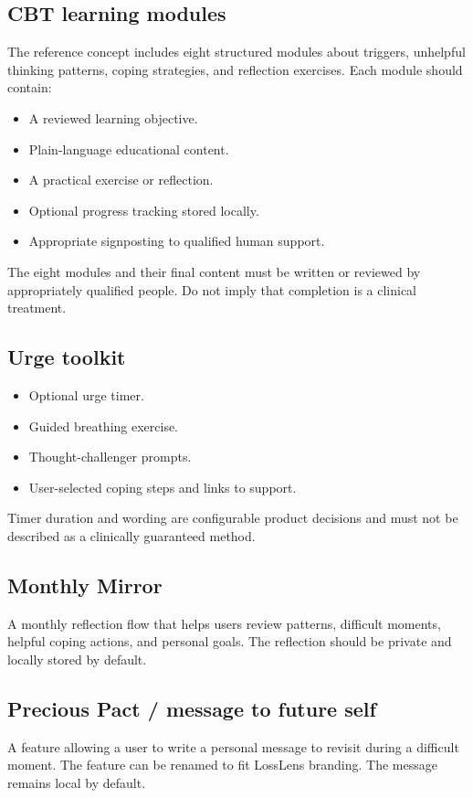 \documentclass[11pt,a4paper]{article}
\begin{document}
\subsection{CBT learning modules}
The reference concept includes eight structured modules about triggers, unhelpful thinking patterns, coping strategies, and reflection exercises. Each module should contain:
\begin{itemize}
  \item A reviewed learning objective.
  \item Plain-language educational content.
  \item A practical exercise or reflection.
  \item Optional progress tracking stored locally.
  \item Appropriate signposting to qualified human support.
\end{itemize}
The eight modules and their final content must be written or reviewed by appropriately qualified people. Do not imply that completion is a clinical treatment.

\subsection{Urge toolkit}
\begin{itemize}
  \item Optional urge timer.
  \item Guided breathing exercise.
  \item Thought-challenger prompts.
  \item User-selected coping steps and links to support.
\end{itemize}
Timer duration and wording are configurable product decisions and must not be described as a clinically guaranteed method.

\subsection{Monthly Mirror}
A monthly reflection flow that helps users review patterns, difficult moments, helpful coping actions, and personal goals. The reflection should be private and locally stored by default.

\subsection{Precious Pact / message to future self}
A feature allowing a user to write a personal message to revisit during a difficult moment. The feature can be renamed to fit LossLens branding. The message remains local by default.
\end{document}
